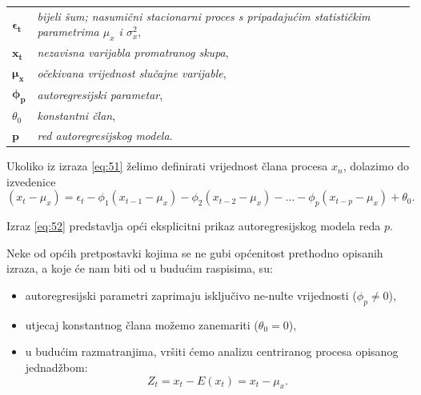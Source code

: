 \documentclass[a4paper,12pt,oneside]{memoir}
\begin{document}
            \begin{table}[H]
                \centering
                \begin{tabular*}{0.9\textwidth}{>{\bfseries}l p{13cm}}
                    \textit{\textbf{$\boldsymbol{\epsilon_t}$}} & \textit{bijeli šum; nasumični stacionarni proces s pripadajućim statističkim parametrima $\mu_x$ i $\sigma_x^2$},\\
                    \textit{\textbf{$\boldsymbol{x_t}$}} & \textit{nezavisna varijabla promatranog skupa},\\
                    \textit{\textbf{$\boldsymbol{\mu_x}$}} & \textit{očekivana vrijednost slučajne varijable},\\
                    \textit{\textbf{$\boldsymbol{\phi_p}$}} & \textit{autoregresijski parametar},\\
                    \textit{\textbf{$\theta_0$}} & \textit{konstantni član},\\
                    \textit{\textbf{$\boldsymbol{p}$}} & \textit{red autoregresijskog modela}.\\
                \end{tabular*}
            \end{table}

            Ukoliko iz izraza \eqref{eq:51} želimo definirati vrijednost člana procesa $x_n$, dolazimo do izvedenice
            \begin{equation}
                (x_t-\mu_x)=\epsilon_t-\phi_1(x_{t-1}-\mu_x)-\phi_2(x_{t-2}-\mu_x)-\ldots-\phi_p(x_{t-p}-\mu_x)+\theta_0.
                \label{eq:52}
            \end{equation}

            Izraz \eqref{eq:52} predstavlja opći eksplicitni prikaz autoregresijskog modela reda $p$.

            Neke od općih pretpostavki kojima se ne gubi općenitost prethodno opisanih izraza, a koje će nam biti od u budućim raspisima, su:

            \begin{itemize}
                \item autoregresijski parametri zaprimaju isključivo ne-nulte vrijednosti ($\phi_p\neq0$),
                \item utjecaj konstantnog člana možemo zanemariti ($\theta_0=0$),
                \item u budućim razmatranjima, vršiti ćemo analizu centriranog procesa opisanog jednadžbom:
                \begin{equation}
                    Z_t=x_t-E(x_t)=x_t-\mu_x.
                    \label{eq:53}
                \end{equation}
            \end{itemize}
\end{document}
